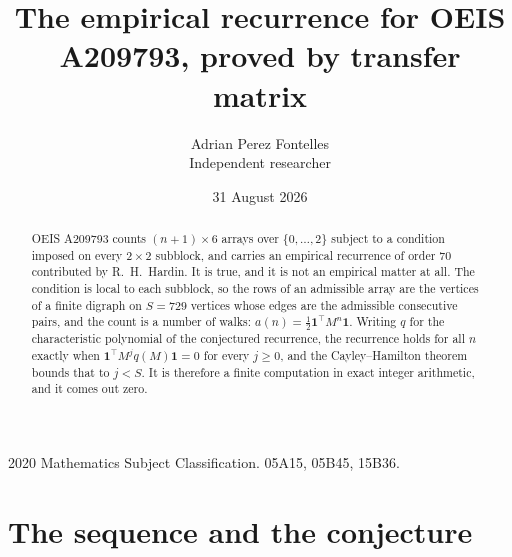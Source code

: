 \documentclass[11pt,a4paper]{article}
\title{The empirical recurrence for OEIS A209793, proved by transfer matrix}
\author{Adrian Perez Fontelles\\ \small Independent researcher}
\date{31 August 2026}
\theoremstyle{plain}
\theoremstyle{definition}
\begin{document}
\maketitle

\begin{abstract}
OEIS A209793 counts $(n+1)\times6$ arrays over $\{0,\dots,2\}$ subject to a condition imposed on
every $2\times2$ subblock, and carries an empirical recurrence of order $70$ contributed
by R.~H.~Hardin. It is true, and it is not an empirical matter at all. The condition is local
to each subblock, so the rows of an admissible array are the vertices of a finite digraph
on $S=729$ vertices whose edges are the admissible consecutive pairs, and the count is a
number of walks: $a(n)=\tfrac1{2}\mathbf{1}^{\!\top}M^{n}\mathbf{1}$. Writing $q$
for the characteristic polynomial of the conjectured recurrence, the recurrence holds for all
$n$ exactly when $\mathbf{1}^{\!\top}M^{j}q(M)\mathbf{1}=0$ for every $j\ge0$, and the
Cayley--Hamilton theorem bounds that to $j<S$. It is therefore a finite computation in exact
integer arithmetic, and it comes out zero.
\end{abstract}

\noindent\small 2020 Mathematics Subject Classification. 05A15, 05B45, 15B36.\normalsize

\section{The sequence and the conjecture}
\end{document}
